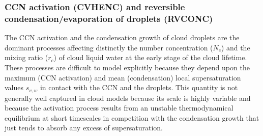 
\subsubsection{CCN activation (CVHENC) and reversible condensation/evaporation
of droplets (RVCONC)}

The CCN activation  and the condensation growth of cloud droplets are the 
dominant processes affecting distinctly the number concentration ($N_c$) 
and the mixing ratio ($r_c$) of cloud liquid water at the early stage of 
the cloud lifetime. These processes are difficult to model explicitly 
because they depend upon the maximum (CCN activation) and mean (condensation) 
local supersaturation values $s_{v,w}$ in contact with the CCN and the 
droplets. This quantity is not generally well captured in cloud models 
because its scale is highly variable and because the activation process results 
from an unstable thermodynamical equilibrium at short timescales in 
competition with the condensation growth that just tends to absorb any 
excess of supersaturation.


